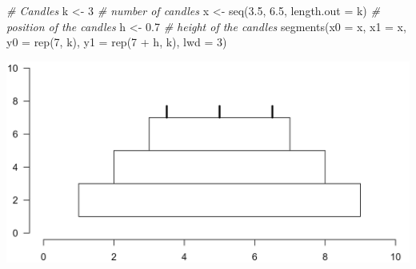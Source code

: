 \documentclass[
]{book}
\newenvironment{Shaded}{\begin{snugshade}}{\end{snugshade}}
\newcommand{\AttributeTok}[1]{\textcolor[rgb]{0.77,0.63,0.00}{#1}}
\newcommand{\CommentTok}[1]{\textcolor[rgb]{0.56,0.35,0.01}{\textit{#1}}}
\newcommand{\DecValTok}[1]{\textcolor[rgb]{0.00,0.00,0.81}{#1}}
\newcommand{\FloatTok}[1]{\textcolor[rgb]{0.00,0.00,0.81}{#1}}
\newcommand{\FunctionTok}[1]{\textcolor[rgb]{0.00,0.00,0.00}{#1}}
\newcommand{\NormalTok}[1]{#1}
\newcommand{\OtherTok}[1]{\textcolor[rgb]{0.56,0.35,0.01}{#1}}
\newcommand{\SpecialCharTok}[1]{\textcolor[rgb]{0.00,0.00,0.00}{#1}}
\begin{document}
\begin{Shaded}
\begin{Highlighting}[]
\CommentTok{\# Candles}
\NormalTok{k }\OtherTok{\textless{}{-}} \DecValTok{3}                             \CommentTok{\# number of candles}
\NormalTok{x }\OtherTok{\textless{}{-}} \FunctionTok{seq}\NormalTok{(}\FloatTok{3.5}\NormalTok{, }\FloatTok{6.5}\NormalTok{, }\AttributeTok{length.out =}\NormalTok{ k) }\CommentTok{\# position of the candles}
\NormalTok{h }\OtherTok{\textless{}{-}} \FloatTok{0.7}                           \CommentTok{\# height of the candles}
\FunctionTok{segments}\NormalTok{(}\AttributeTok{x0 =}\NormalTok{ x, }\AttributeTok{x1 =}\NormalTok{ x, }\AttributeTok{y0 =} \FunctionTok{rep}\NormalTok{(}\DecValTok{7}\NormalTok{, k), }\AttributeTok{y1 =} \FunctionTok{rep}\NormalTok{(}\DecValTok{7} \SpecialCharTok{+}\NormalTok{ h, k), }\AttributeTok{lwd =} \DecValTok{3}\NormalTok{)}
\end{Highlighting}
\end{Shaded}

\includegraphics[width=28in]{figures/cake}
\end{document}

